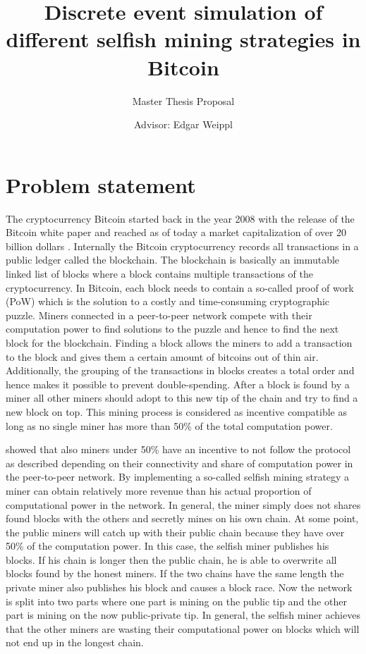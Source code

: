 \documentclass{scrartcl}
\title{Discrete event simulation of different selfish mining strategies in Bitcoin}
\subtitle{Master Thesis Proposal}
\author{Advisor: Edgar Weippl}
\begin{document}
\maketitle

\section{Problem statement}
The cryptocurrency Bitcoin started back in the year 2008 with the release of the Bitcoin white paper \cite{nakamoto2008bitcoin} and reached as of today a market capitalization of over 20 billion dollars \cite{marketcap2017}. Internally the Bitcoin cryptocurrency records all transactions in a public ledger called the blockchain. The blockchain is basically an immutable linked list of blocks where a block contains multiple transactions of the cryptocurrency. In Bitcoin, each block needs to contain a so-called proof of work (PoW) which is the solution to a costly and time-consuming cryptographic puzzle. Miners connected in a peer-to-peer network compete with their computation power to find solutions to the puzzle and hence to find the next block for the blockchain. Finding a block allows the miners to add a transaction to the block and gives them a certain amount of bitcoins out of thin air. Additionally, the grouping of the transactions in blocks creates a total order and hence makes it possible to prevent double-spending. After a block is found by a miner all other miners should adopt to this new tip of the chain and try to find a new block on top. This mining process is considered as incentive compatible as long as no single miner has more than 50\% of the total computation power.

\citeauthor{eyal2014majority} showed that also miners under 50\% have an incentive to not follow the protocol as described depending on their connectivity and share of computation power in the peer-to-peer network. By implementing a so-called selfish mining strategy a miner can obtain relatively more revenue than his actual proportion of computational power in the network. In general, the miner simply does not shares found blocks with the others and secretly mines on his own chain. At some point, the public miners will catch up with their public chain because they have over 50\% of the computation power. In this case, the selfish miner publishes his blocks. If his chain is longer then the public chain, he is able to overwrite all blocks found by the honest miners. If the two chains have the same length the private miner also publishes his block and causes a block race. Now the network is split into two parts where one part is mining on the public tip and the other part is mining on the now public-private tip. In general, the selfish miner achieves that the other miners are wasting their computational power on blocks which will not end up in the longest chain.
\end{document}
